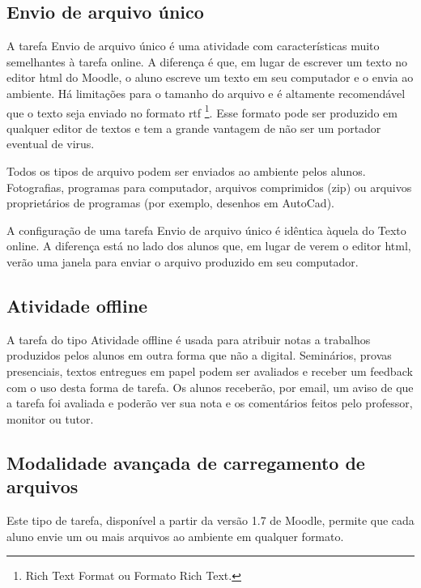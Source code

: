 \subsection{Envio de arquivo único}


A tarefa Envio de arquivo único é uma atividade com características muito semelhantes à tarefa online. A diferença é que, em lugar de escrever um texto no editor html do Moodle, o aluno escreve um texto em seu computador e o envia ao ambiente. Há limitações para o tamanho do arquivo e é altamente recomendável que o texto seja enviado no formato rtf \footnote{Rich Text Format ou Formato Rich Text.}. Esse formato pode ser produzido em qualquer editor de textos e tem a grande vantagem de não ser um portador eventual de virus.

Todos os tipos de arquivo podem ser enviados ao ambiente pelos alunos. Fotografias, programas para computador, arquivos comprimidos (zip) ou arquivos proprietários de programas (por exemplo, desenhos em AutoCad).

A configuração de uma tarefa Envio de arquivo único é idêntica àquela do Texto online. A diferença está no lado dos alunos que, em lugar de verem o editor html, verão uma janela para enviar o arquivo produzido em seu computador.

\subsection{Atividade offline}


A tarefa do tipo Atividade offline é usada para atribuir notas a trabalhos produzidos pelos alunos em outra forma que não a digital. Seminários, provas presenciais, textos entregues em papel podem ser avaliados e receber um feedback com o uso desta forma de tarefa. Os alunos receberão, por email, um aviso de que a tarefa foi avaliada e poderão ver sua nota e os comentários feitos pelo professor, monitor ou tutor.

\subsection{Modalidade avançada de carregamento de arquivos}


Este tipo de tarefa, disponível a partir da versão 1.7 de Moodle, permite que cada aluno envie um ou mais arquivos ao ambiente em qualquer formato.

